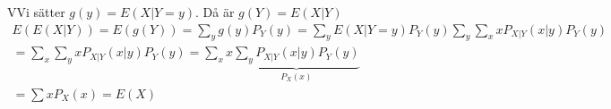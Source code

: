 \newpage
\begin{prf}
  VVi sätter $g(y) = E(X|Y=y)$. Då är $g(Y) = E(X|Y)$
  \begin{equation*}
    \begin{gathered}
      E(E(X|Y)) = E(g(Y)) = \sum_y g(y)P_Y(y) = \sum_y E(X|Y=y)P_Y(y)\sum_y\sum_xxP_{X|Y}(x|y)P_Y(y)\\
      =\sum_x\sum_yxP_{X|Y}(x|y)P_Y(y) =\sum_xx\underbrace{\sum_yP_{X|Y}(x|y)P_Y(y)}_{\text{$P_X(x)$}}\\
      =\sum xP_X(x)=E(X)
    \end{gathered}
  \end{equation*}
\end{prf}
